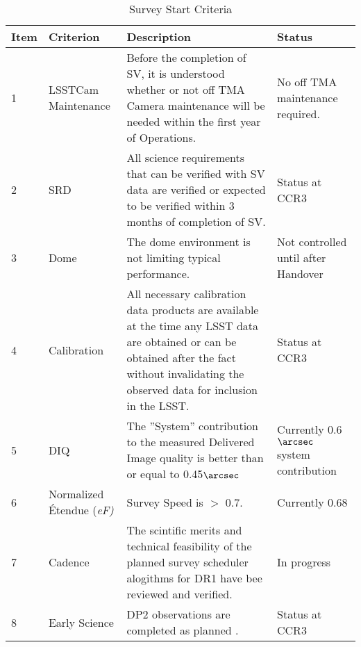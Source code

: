 \begin{table}[]
\renewcommand{\arraystretch}{2}
\small
\centering
\caption{Survey Start Criteria}\label{tab:criteria}
\begin{tabular}{|p{0.25in}|p{1in}|p{4in}|p{1.0in}|}
\hline
Item & Criterion & Description& Status \\
\hline \hline

1 & \makecell[l]{LSSTCam\\ Maintenance} & Before the completion of SV, it is understood whether or not off TMA Camera maintenance will be needed within the first year of Operations.& No off TMA maintenance required.  \\\hline  

2 & SRD & All science requirements that can be verified with SV data are verified or expected to be verified within 3 months of completion of SV. & Status at CCR3 \\\hline

3 & Dome & The dome environment is not limiting typical performance. &\makecell[l]{ Not controlled \\until after \\Handover} \\\hline

4 & Calibration & All necessary calibration data products are available at the time any LSST data are obtained or can be obtained after the fact without invalidating the observed data for inclusion in the LSST. & Status at CCR3 \\\hline

5 & DIQ & The ''System'' contribution to the measured Delivered Image quality is better than or equal to 0.45$\arcsec$ & \makecell[l]{Currently 0.6$\arcsec$ \\system \\contribution}\\\hline

6 & Normalized \'{E}tendue (\it{eF}) & Survey Speed  is $>$ 0.7. & Currently 0.68 \\\hline

7 & Cadence & The scintific merits and technical feasibility of the planned survey scheduler alogithms for DR1 have bee reviewed and verified. & In progress\\\hline

8 & Early Science & DP2 observations are completed as planned \citep{RTN-011}.& Status at CCR3 \\

\hline
\end{tabular}
\end{table}

